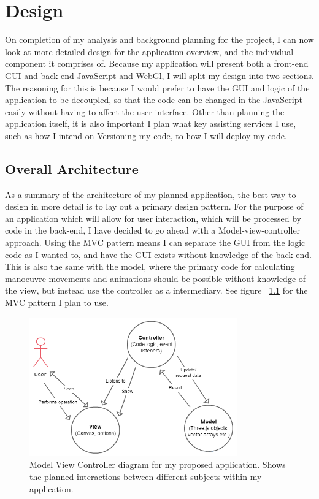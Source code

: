 \chapter{Design}
On completion of my analysis and background planning for the project, I can now look at more detailed design for the application overview, and the individual component it comprises of. Because my application will present both a front-end GUI and back-end JavaScript and WebGl, I will split my design into two sections. The reasoning for this is because I would prefer to have the GUI and logic of the application to be decoupled, so that the code can be changed in the JavaScript easily without having to affect the user interface. Other than planning the application itself, it is also important I plan what key assisting services I use, such as how I intend on Versioning  my code, to how I will deploy my code.

\section{Overall Architecture}
As a summary of the architecture of my planned application, the best way to design in more detail is to lay out a primary design pattern. For the purpose of an application which will allow for user interaction, which will be processed by code in the back-end, I have decided to go ahead with a Model-view-controller approach. Using the MVC pattern means I can separate the GUI from the logic code as I wanted to, and have the GUI exists without knowledge of the back-end. This is also the same with the model, where the primary code for calculating manoeuvre movements and animations should be possible without knowledge of the view, but instead use the controller as a intermediary. See figure ~\ref{fig:mvc} for the MVC pattern I plan to use. 

\begin{figure}[h!]
  \centering
      \includegraphics[width=0.8\textwidth]{images/mvc.png}
  \caption{Model View Controller diagram for my proposed application. Shows the planned interactions between different subjects within my application.}
  \label{fig:mvc}
\end{figure}

